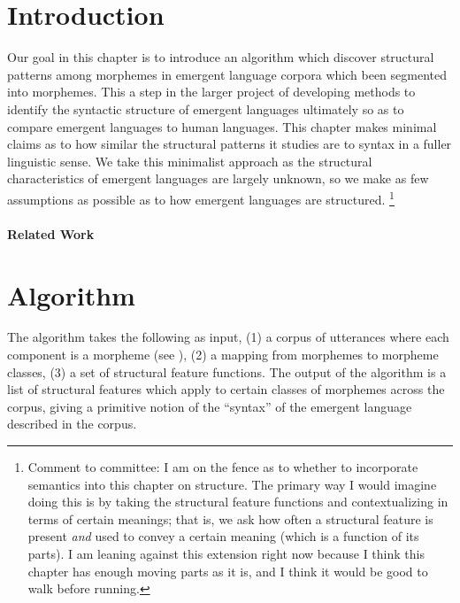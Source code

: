 \newcommand\tsc\textsc


\section{Introduction}

Our goal in this chapter is to introduce an algorithm which discover structural patterns among morphemes in emergent language corpora which been segmented into morphemes.
This a step in the larger project of developing methods to identify the syntactic structure of emergent languages ultimately so as to compare emergent languages to human languages.
This chapter makes minimal claims as to how similar the structural patterns it studies are to syntax in a fuller linguistic sense.
We take this minimalist approach as the structural characteristics of emergent languages are largely unknown, so we make as few assumptions as possible as to how emergent languages are structured.
\unskip\footnote{Comment to committee: I am on the fence as to whether to incorporate semantics into this chapter on structure. The primary way I would imagine doing this is by taking the structural feature functions and contextualizing in terms of certain meanings; that is, we ask how often a structural feature is present \emph{and} used to convey a certain meaning (which is a function of its parts).  I am leaning against this extension right now because I think this chapter has enough moving parts as it is, and I think it would be good to walk before running.}

\paragraph{Related Work}
\phantom{}%

\section{Algorithm}

The algorithm takes the following as input,
  (1) a corpus of utterances where each component is a morpheme (see ),
  (2) a mapping from morphemes to morpheme classes,
  (3) a set of structural feature functions.
The output of the algorithm is a list of structural features which apply to certain classes of morphemes across the corpus, giving a primitive notion of the ``syntax'' of the emergent language described in the corpus.


